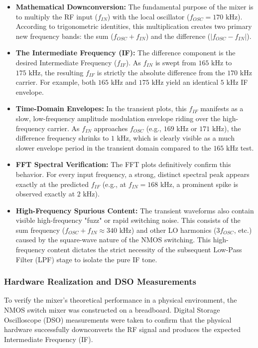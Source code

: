 \documentclass[conference]{IEEEtran}
\begin{document}
\begin{itemize}
    \item \textbf{Mathematical Downconversion:} The fundamental purpose of the mixer is to multiply the RF input ($f_{IN}$) with the local oscillator ($f_{OSC} = 170\text{ kHz}$). According to trigonometric identities, this multiplication creates two primary new frequency bands: the sum ($f_{OSC} + f_{IN}$) and the difference ($|f_{OSC} - f_{IN}|$).
    \item \textbf{The Intermediate Frequency (IF):} The difference component is the desired Intermediate Frequency ($f_{IF}$). As $f_{IN}$ is swept from $165\text{ kHz}$ to $175\text{ kHz}$, the resulting $f_{IF}$ is strictly the absolute difference from the $170\text{ kHz}$ carrier. For example, both $165\text{ kHz}$ and $175\text{ kHz}$ yield an identical $5\text{ kHz}$ IF envelope.
    \item \textbf{Time-Domain Envelopes:} In the transient plots, this $f_{IF}$ manifests as a slow, low-frequency amplitude modulation envelope riding over the high-frequency carrier. As $f_{IN}$ approaches $f_{OSC}$ (e.g., $169\text{ kHz}$ or $171\text{ kHz}$), the difference frequency shrinks to $1\text{ kHz}$, which is clearly visible as a much slower envelope period in the transient domain compared to the $165\text{ kHz}$ test.
    \item \textbf{FFT Spectral Verification:} The FFT plots definitively confirm this behavior. For every input frequency, a strong, distinct spectral peak appears exactly at the predicted $f_{IF}$ (e.g., at $f_{IN} = 168\text{ kHz}$, a prominent spike is observed exactly at $2\text{ kHz}$).
    \item \textbf{High-Frequency Spurious Content:} The transient waveforms also contain visible high-frequency "fuzz" or rapid switching noise. This consists of the sum frequency ($f_{OSC} + f_{IN} \approx 340\text{ kHz}$) and other LO harmonics ($3f_{OSC}$, etc.) caused by the square-wave nature of the NMOS switching. This high-frequency content dictates the strict necessity of the subsequent Low-Pass Filter (LPF) stage to isolate the pure IF tone.
\end{itemize}

\subsubsection{Hardware Realization and DSO Measurements}
To verify the mixer's theoretical performance in a physical environment, the NMOS switch mixer was constructed on a breadboard. Digital Storage Oscilloscope (DSO) measurements were taken to confirm that the physical hardware successfully downconverts the RF signal and produces the expected Intermediate Frequency (IF).
\end{document}
